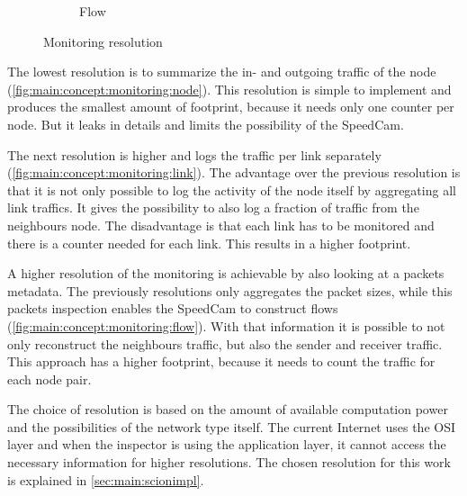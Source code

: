 \documentclass[thesis.tex]{subfiles}
\begin{document}
\begin{figure}[h]
\begin{subfigure}{.3\linewidth}
		\caption{Flow}
		\label{fig:main:concept:monitoring:flow}
	\end{subfigure}
	
	\caption{Monitoring resolution}
	\label{fig:main:concept:monitoring}
\end{figure}
The lowest resolution is to summarize the in- and outgoing traffic of the node  (\autoref{fig:main:concept:monitoring:node}). This resolution is simple to implement and produces the smallest amount of footprint, because it needs only one counter per node. But it leaks in details and limits the possibility of the SpeedCam.

The next resolution is higher and logs the traffic per link separately  (\autoref{fig:main:concept:monitoring:link}). The advantage over the previous resolution is that it is not only possible to log the activity of the node itself by aggregating all link traffics. It gives the possibility to also log a fraction of traffic from the neighbours node. The disadvantage is that each link has to be monitored and there is a counter needed for each link. This results in a higher footprint.

A higher resolution of the monitoring is achievable by also looking at a packets metadata. The previously resolutions only aggregates the packet sizes, while this packets inspection enables the SpeedCam to construct flows  (\autoref{fig:main:concept:monitoring:flow}). With that information it is possible to not only reconstruct the neighbours traffic, but also the sender and receiver traffic. This approach has a higher footprint, because it needs to count the traffic for each node pair.

The choice of resolution is based on the amount of available computation power and the possibilities of the network type itself. The current Internet uses the OSI layer  and when the inspector is using the application layer, it cannot access the necessary information for higher resolutions. The chosen resolution for this work is explained in \autoref{sec:main:scionimpl}.
\end{document}
